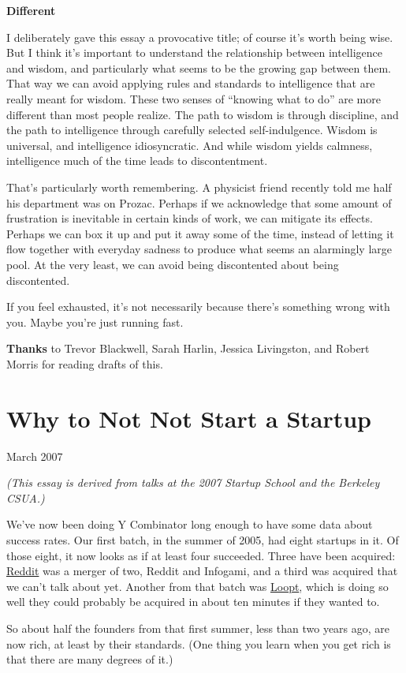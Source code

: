 \documentclass[12pt]{book}
\begin{document}
\textbf{Different}

I deliberately gave this essay a provocative title; of course it's worth
being wise. But I think it's important to understand the relationship
between intelligence and wisdom, and particularly what seems to be the
growing gap between them. That way we can avoid applying rules and
standards to intelligence that are really meant for wisdom. These two
senses of ``knowing what to do'' are more different than most people
realize. The path to wisdom is through discipline, and the path to
intelligence through carefully selected self-indulgence. Wisdom is
universal, and intelligence idiosyncratic. And while wisdom yields
calmness, intelligence much of the time leads to discontentment.

That's particularly worth remembering. A physicist friend recently told
me half his department was on Prozac. Perhaps if we acknowledge that
some amount of frustration is inevitable in certain kinds of work, we
can mitigate its effects. Perhaps we can box it up and put it away some
of the time, instead of letting it flow together with everyday sadness
to produce what seems an alarmingly large pool. At the very least, we
can avoid being discontented about being discontented.

If you feel exhausted, it's not necessarily because there's something
wrong with you. Maybe you're just running fast.


\textbf{Thanks} to Trevor Blackwell, Sarah Harlin, Jessica Livingston,
and Robert Morris for reading drafts of this.
\chapter{Why to Not Not Start a Startup}

March 2007

\emph{(This essay is derived from talks at the 2007 Startup School and
the Berkeley CSUA.)}

We've now been doing Y Combinator long enough to have some data about
success rates. Our first batch, in the summer of 2005, had eight
startups in it. Of those eight, it now looks as if at least four
succeeded. Three have been acquired: \href{http://reddit.com}{Reddit}
was a merger of two, Reddit and Infogami, and a third was acquired that
we can't talk about yet. Another from that batch was
\href{http://loopt.com}{Loopt}, which is doing so well they could
probably be acquired in about ten minutes if they wanted to.

So about half the founders from that first summer, less than two years
ago, are now rich, at least by their standards. (One thing you learn
when you get rich is that there are many degrees of it.)
\end{document}

